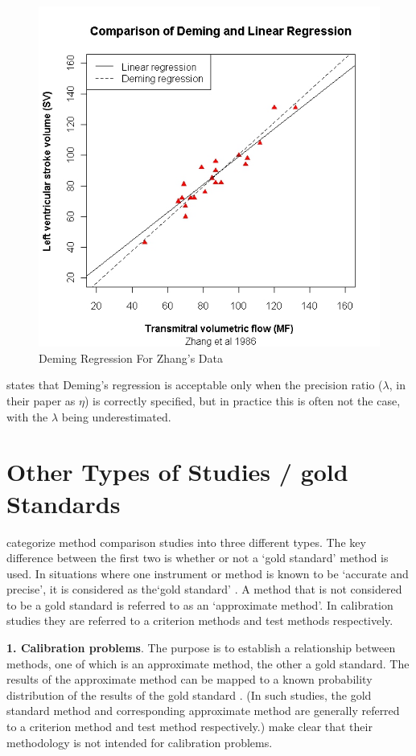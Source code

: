 \documentclass[12pt, a4paper]{report}
\theoremstyle{plain}
\theoremstyle{definition}
\theoremstyle{remark}
\begin{document}
	
	\begin{figure}[h!]
		\includegraphics[width=130mm]{images/ZhangDeming.jpeg}
		\caption{Deming Regression For Zhang's Data}\label{ZhangDeming}
	\end{figure}
	
	
	\citet{CarollRupert} states that Deming's
	regression is acceptable only when the precision ratio ($\lambda$,
	in their paper as $\eta$) is correctly specified, but in practice
	this is often not the case, with the $\lambda$ being
	underestimated.
		\section{Other Types of Studies / gold Standards}
		\citet{lewis} categorize method comparison studies into three
		different types.  The key difference between the first two is
		whether or not a `gold standard' method is used. In situations
		where one instrument or method is known to be `accurate and
		precise', it is considered as the`gold standard' \citep{lewis}. A
		method that is not considered to be a gold standard is referred to
		as an `approximate method'. In calibration studies they are
		referred to a criterion methods and test methods respectively.
		
		
		\textbf{1. Calibration problems}. The purpose is to establish a
		relationship between methods, one of which is an approximate
		method, the other a gold standard. The results of the approximate
		method can be mapped to a known probability distribution of the
		results of the gold standard \citep{lewis}. (In such studies, the
		gold standard method and corresponding approximate method are
		generally referred to a criterion method and test method
		respectively.) \citet*{BA83} make clear that their methodology is
		not intended for calibration problems.
		
\end{document}
